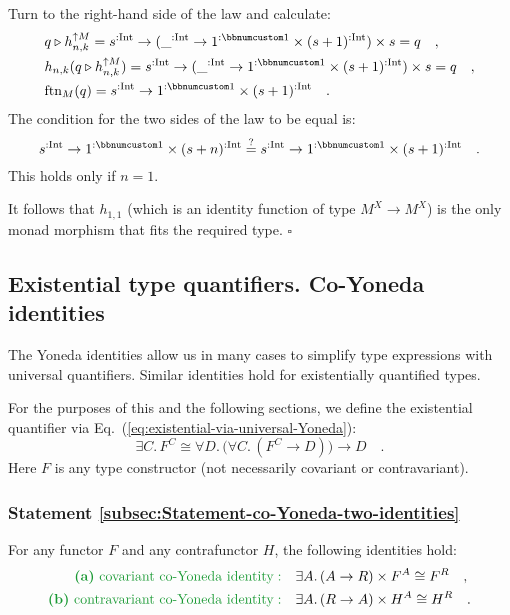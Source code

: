 Turn to the right-hand side of the law and calculate:
\begin{align*}
 & q\triangleright h_{n,k}^{\uparrow M}=s^{:\text{Int}}\rightarrow(\_^{:\text{Int}}\rightarrow1^{:\bbnum 1}\times(s+1)^{:\text{Int}})\times s=q\quad,\\
 & h_{n,k}(q\triangleright h_{n,k}^{\uparrow M})=s^{:\text{Int}}\rightarrow(\_^{:\text{Int}}\rightarrow1^{:\bbnum 1}\times(s+1)^{:\text{Int}})\times s=q\quad,\\
 & \text{ftn}_{M}(q)=s^{:\text{Int}}\rightarrow1^{:\bbnum 1}\times(s+1)^{:\text{Int}}\quad.
\end{align*}
The condition for the two sides of the law to be equal is:
\[
s^{:\text{Int}}\rightarrow1^{:\bbnum 1}\times(s+n)^{:\text{Int}}\overset{?}{=}s^{:\text{Int}}\rightarrow1^{:\bbnum 1}\times(s+1)^{:\text{Int}}\quad.
\]
This holds only if $n=1$.

It follows that $h_{1,1}$ (which is an identity function of type
$M^{X}\rightarrow M^{X}$) is the only monad morphism that fits the
required type. $\square$

\subsection{Existential type quantifiers. Co-Yoneda identities}

The Yoneda identities allow us in many cases to simplify type expressions
with universal quantifiers. Similar identities hold for existentially
quantified types.

For the purposes of this and the following sections, we define the
existential quantifier via Eq.~(\ref{eq:existential-via-universal-Yoneda}):
\[
\exists C.\,F^{C}\cong\forall D.\,\big(\forall C.\,(F^{C}\rightarrow D)\big)\rightarrow D\quad.
\]
Here $F$ is any type constructor (not necessarily covariant or contravariant).

\subsubsection{Statement \label{subsec:Statement-co-Yoneda-two-identities}\ref{subsec:Statement-co-Yoneda-two-identities}}

For any functor $F$ and any contrafunctor $H$, the following identities
hold:
\begin{align*}
{\color{greenunder}\text{\textbf{(a)} }\text{covariant co-Yoneda identity}:}\quad & \exists A.\,(A\rightarrow R)\times F^{A}\cong F^{R}\quad,\\
{\color{greenunder}\text{\textbf{(b)} }\text{contravariant co-Yoneda identity}:}\quad & \exists A.\,(R\rightarrow A)\times H^{A}\cong H^{R}\quad.
\end{align*}


